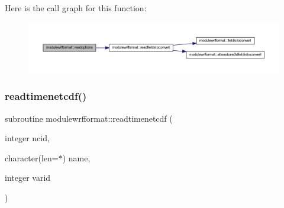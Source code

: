 Here is the call graph for this function\+:\nopagebreak
\begin{figure}[H]
\begin{center}
\leavevmode
\includegraphics[width=350pt]{namespacemodulewrfformat_a00bbd242b402a9ccd03ef1e1f7c2721e_cgraph}
\end{center}
\end{figure}
\mbox{\label{namespacemodulewrfformat_af33b325d2707c25986c4337ea9954b91}} 
\subsubsection{\texorpdfstring{readtimenetcdf()}{readtimenetcdf()}}
{\footnotesize\ttfamily subroutine modulewrfformat\+::readtimenetcdf (\begin{DoxyParamCaption}\item[{integer}]{ncid,  }\item[{character(len=$\ast$)}]{name,  }\item[{integer}]{varid }\end{DoxyParamCaption})\hspace{0.3cm}{\ttfamily [private]}}

